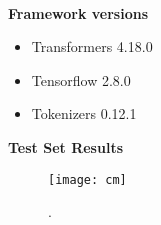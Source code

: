 %
%
\\
\textbf{Framework versions}
\begin{itemize}
    \item Transformers 4.18.0
    \item Tensorflow 2.8.0
    \item Tokenizers 0.12.1
\end{itemize}%
%
\pagebreak
\textbf{Test Set Results}
\begin{figure}[h]
    \centering
    \texttt{[image: cm]}
    \caption{
        .
    }
    \label{fig:cm}
\end{figure}
